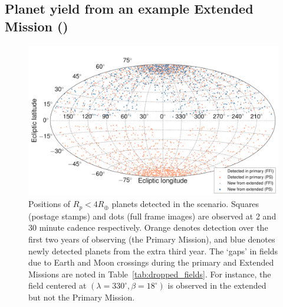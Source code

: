 \subsection{Planet yield from an example Extended Mission (\rm{\nhemi}) }
\label{sec:results_from_nhemi_extended_mission}

\begin{figure}[t]
	\centering
	\includegraphics[]{figures/skymap_dropped_fields.pdf}
	\caption{Positions of $R_p<4R_\oplus$ planets detected in the \npole\:scenario. Squares (postage stamps) and dots (full frame images) are observed at 2 and 30 minute cadence respectively. Orange denotes detection over the first two years of observing (the Primary Mission), and blue denotes newly detected planets from the extra third year. The `gaps' in fields due to Earth and Moon crossings during the primary and Extended Missions are noted in Table~\protect\ref{tab:dropped_fields}. For instance, the field centered at $(\lambda=330^\circ,\beta=18^\circ)$ is observed in the extended but not the Primary Mission. }
	\label{fig:skymap_nhemi}
\end{figure}
